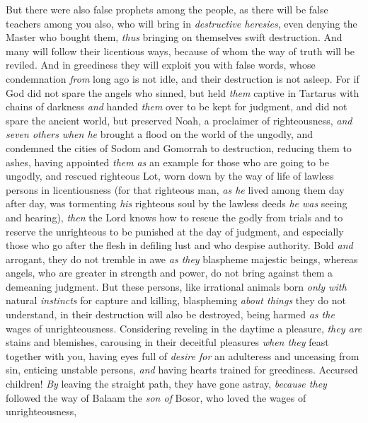 \begin{biblechapter} %
 But there were also false prophets among the people, as there will be false teachers among you also, who will bring in \textit{destructive heresies}, even denying the Master who bought them, \textit{thus} bringing on themselves swift destruction.
\verse And many will follow their licentious ways, because of whom the way of truth will be reviled.
\verse And in greediness they will exploit you with false words, whose condemnation \textit{from} long ago is not idle, and their destruction is not asleep.
\verse For if God did not spare the angels who sinned, but held \textit{them} captive in Tartarus with chains of darkness \textit{and} handed \textit{them} over to be kept for judgment,
\verse and did not spare the ancient world, but preserved Noah, a proclaimer of righteousness, \textit{and seven others} \textit{when he} brought a flood on the world of the ungodly,
\verse and condemned the cities of Sodom and Gomorrah to destruction, reducing them to ashes, having appointed \textit{them} \textit{as} an example for those who are going to be ungodly,
\verse and rescued righteous Lot, worn down by the way of life of lawless persons in licentiousness
\verse (for that righteous man, \textit{as he} lived among them day after day, was tormenting \textit{his} righteous soul by the lawless deeds \textit{he was} seeing and hearing),
\verse \textit{then} the Lord knows how to rescue the godly from trials and to reserve the unrighteous to be punished at the day of judgment,
\verse and especially those who go after the flesh in defiling lust and who despise authority.
\verse Bold \textit{and} arrogant, they do not tremble in awe \textit{as they} blaspheme majestic beings,
\verse whereas angels, who are greater in strength and power, do not bring against them a demeaning judgment.
\verse But these persons, like irrational animals born \textit{only with} natural \textit{instincts} for capture and killing, blaspheming \textit{about things} they do not understand, in their destruction will also be destroyed,
\verse being harmed \textit{as the} wages of unrighteousness. Considering reveling in the daytime a pleasure, \textit{they are} stains and blemishes, carousing in their deceitful pleasures \textit{when they} feast together with you,
\verse having eyes full of \textit{desire for} an adulteress and unceasing from sin, enticing unstable persons, \textit{and} having hearts trained for greediness. Accursed children!
\verse \textit{By} leaving the straight path, they have gone astray, \textit{because they} followed the way of Balaam the \textit{son of} Bosor, who loved the wages of unrighteousness,

\end{biblechapter}
